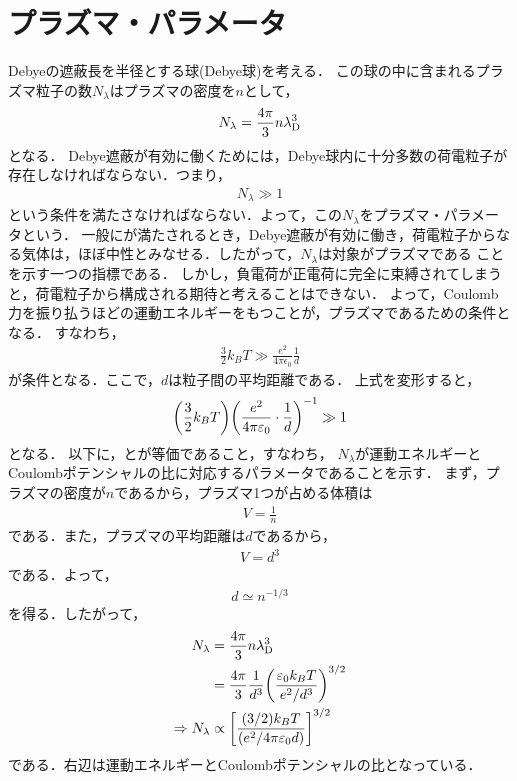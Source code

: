 \documentclass{report}
\begin{document}
  \section{プラズマ・パラメータ}
    Debyeの遮蔽長を半径とする球(Debye球)を考える．
    この球の中に含まれるプラズマ粒子の数$N_\lambda$はプラズマの密度を$n$として，
    \begin{align}
      N_\lambda = \frac{4\pi}{3}n \lambda_{\mathrm{D}}^3
    \end{align}
    となる．
    Debye遮蔽が有効に働くためには，Debye球内に十分多数の荷電粒子が存在しなければならない．つまり，
    \begin{align}
      N_\lambda \gg 1 \label{plasma-parameter}
    \end{align}
    という条件を満たさなければならない．よって，この$N_\lambda$をプラズマ・パラメータという．
    一般にが満たされるとき，Debye遮蔽が有効に働き，荷電粒子からなる気体は，ほぼ中性とみなせる．したがって，$N_\lambda$は対象がプラズマである
    ことを示す一つの指標である．
    しかし，負電荷が正電荷に完全に束縛されてしまうと，荷電粒子から構成される期待と考えることはできない．
    よって，Coulomb力を振り払うほどの運動エネルギーをもつことが，プラズマであるための条件となる．
    すなわち，
    \begin{align}
      \frac{3}{2}k_B T \gg \frac{e^2}{4\pi\epsilon_0}\frac{1}{d}
    \end{align}
    が条件となる．ここで，$d$は粒子間の平均距離である．
    上式を変形すると，
    \begin{align}
      \qty(\frac{3}{2}k_B T)\qty(\frac{e^2}{4\pi\varepsilon_0}\cdot\frac{1}{d})^{-1} \gg 1 \label{plasma-parameter2}
    \end{align}
    となる．
    以下に，とが等価であること，すなわち，
    $N_\lambda$が運動エネルギーとCoulombポテンシャルの比に対応するパラメータであることを示す．
    まず，プラズマの密度が$n$であるから，プラズマ1つが占める体積は
    \begin{align}
      V = \frac{1}{n}
    \end{align}
    である．また，プラズマの平均距離は$d$であるから，
    \begin{align}
      V = d^3
    \end{align}
    である．よって，
    \begin{align}
      d \simeq n^{-1/3}
    \end{align}
    を得る．したがって，
    \begin{align}
      N_\lambda &= \frac{4\pi}{3}n \lambda_{\mathrm{D}}^3\\
      &= \frac{4\pi}{3}\frac{1}{d^3}\qty(\frac{\varepsilon_0 k_B T}{e^2/d^3})^{3/2}\\
      \Rightarrow N_\lambda &\propto \qty[\frac{(3/2)k_B T}{(e^2/4\pi\varepsilon_0 d)}]^{3/2}
    \end{align}
    である．右辺は運動エネルギーとCoulombポテンシャルの比となっている．
\end{document}
